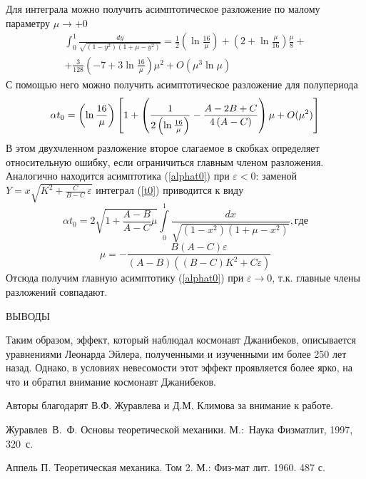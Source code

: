 \documentclass[14pt,a4paper]{extarticle}
\def\DS{\displaystyle}
\def\eps{\varepsilon}
\begin{document}
Для интеграла можно получить асимптотическое разложение по малому параметру $\mu\rightarrow +0$
$$\begin{array}{l} \DS\int_{0}^{1}\frac{dy}{\sqrt{\left( 1-y^{2}\right) \left(
1+\mu -y^{2}\right) }}=\frac{1}{2}\left( \ln \frac{16}{\mu }\right) +\left(2+\ln 
\frac{\mu }{16}\right)\frac{\mu }{8}+\\[2ex]+\DS\frac{3}{128}\left(-7+3\ln \frac{16}{\mu }\right)\mu
^{2}+O(\mu ^{3}\ln \mu)\end{array} $$
С помощью него можно получить асимптотическое разложение для полупериода 
$$\alpha t_{0}=
\left( \ln \frac{16}{\mu }\right) \left[ 1+\left( \frac{1}{2\left( \ln \frac{%
16}{\mu }\right) }-\frac{A-2B+C}{4\left( A-C\right) }\right) \mu +O(\mu ^{2})%
\right] $$
В этом двухчленном разложение второе слагаемое в скобках определяет относительную ошибку, если ограничиться главным членом разложения.\\
Аналогично находится асимптотика (\ref{alphat0}) при $\eps<0$: заменой $Y=x\sqrt{K^2+\frac{C}{B-C}\,\varepsilon}$ интеграл (\ref{t0}) приводится к виду
$$
\alpha t_0=2\sqrt{1+\frac{A-B}{A-C}\mu}{\int\limits_{0}^{1}\frac{dx}{\sqrt{(1-x^2)(1+\mu-x^2)}}}, где
$$
$$
\mu=-\frac{B(A-C)\varepsilon}{\left(A-B\right)\left((B-C)K^2+C\varepsilon\right)}
$$
Отсюда получим главную асимптотику (\ref{alphat0}) при $\eps\rightarrow 0$, т.к. главные члены разложений совпадают.

\newpage


{ВЫВОДЫ} 


\smallskip
Таким образом, эффект, который наблюдал космонавт Джанибеков, описывается уравнениями Леонарда Эйлера, полученными и изученными им более 250 лет назад. Однако, в условиях невесомости этот эффект проявляется более ярко, на что и обратил внимание космонавт Джанибеков. 


\smallskip

Авторы благодарят В.Ф. Журавлева и Д.М. Климова за внимание к работе.

\begin{thebibliography}{99}
 Журавлев~В.~Ф. Основы теоретической механики.
М.:~Наука Физматлит, 1997, 320~с.

 Аппель П. Теоретическая механика. Том 2. М.: Физ-мат лит. 1960. 487 с.
\end{thebibliography}
\end{document}
